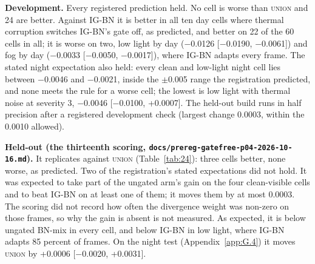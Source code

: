 \documentclass[journal,onecolumn]{IEEEtran}
\begin{document}
\textbf{Development.} Every registered prediction held. No cell is worse than \textsc{union} and 24 are better. Against \mbox{IG-BN} it is better in all ten day cells where thermal corruption switches \mbox{IG-BN}'s gate off, as predicted, and better on 22 of the 60 cells in all; it is worse on two, low light by day ($-$0.0126 [$-$0.0190, $-$0.0061]) and fog by day ($-$0.0033 [$-$0.0050, $-$0.0017]), where \mbox{IG-BN} adapts every frame. The stated night expectation also held: every clean and low-light night cell lies between $-$0.0046 and $-$0.0021, inside the $\pm$0.005 range the registration predicted, and none meets the rule for a worse cell; the lowest is low light with thermal noise at severity 3, $-$0.0046 [$-$0.0100, +0.0007]. The held-out build runs in half precision after a registered development check (largest change 0.0003, within the 0.0010 allowed).

\textbf{Held-out (the thirteenth scoring, \texttt{docs/\allowbreak{}prereg-\allowbreak{}gatefree-\allowbreak{}p04-\allowbreak{}2026-\allowbreak{}10-\allowbreak{}16.md}).} It replicates against \textsc{union} (Table~\ref{tab:24}): three cells better, none worse, as predicted. Two of the registration's stated expectations did not hold. It was expected to take part of the ungated arm's gain on the four clean-visible cells and to beat \mbox{IG-BN} on at least one of them; it moves them by at most 0.0003. The scoring did not record how often the divergence weight was non-zero on those frames, so why the gain is absent is not measured. As expected, it is below ungated BN-mix in every cell, and below \mbox{IG-BN} in low light, where \mbox{IG-BN} adapts 85 percent of frames. On the night test (Appendix~\ref{app:G.4}) it moves \textsc{union} by +0.0006 [$-$0.0020, +0.0031].
\end{document}
